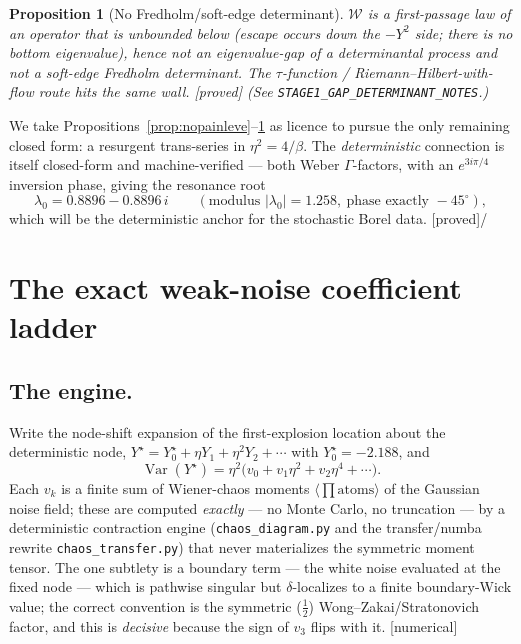 \documentclass[11pt,reqno]{amsart}
\theoremstyle{plain}
\newtheorem{proposition}[theorem]{Proposition}
\theoremstyle{definition}
\theoremstyle{remark}
\newcommand{\W}{\mathcal{W}}
\newcommand{\lz}{\lambda_0}
\DeclareMathOperator{\Var}{Var}
\newcommand{\tagP}{{\footnotesize\textsf{[proved]}}}
\newcommand{\tagN}{{\footnotesize\textsf{[numerical]}}}
\begin{document}
\begin{proposition}[No Fredholm/soft-edge determinant]\label{prop:nofredholm}
$\W$ is a first-passage law of an operator that is \emph{unbounded below} (escape occurs down
the $-Y^2$ side; there is no bottom eigenvalue), hence not an eigenvalue-gap of a determinantal
process and not a soft-edge Fredholm determinant. The $\tau$-function / Riemann--Hilbert-with-flow
route hits the same wall. \tagP{} \emph{(See \texttt{STAGE1\_GAP\_DETERMINANT\_NOTES}.)}
\end{proposition}

We take Propositions~\ref{prop:nopainleve}--\ref{prop:nofredholm} as licence to pursue the only
remaining closed form: a resurgent trans-series in $\eta^2=4/\beta$. The \emph{deterministic}
connection is itself closed-form and machine-verified --- both Weber $\Gamma$-factors, with an
$e^{3i\pi/4}$ inversion phase, giving the resonance root
\begin{equation}\label{eq:lz}
\lz=0.8896-0.8896\,i \qquad(\text{modulus }|\lz|=1.258,\ \text{phase exactly }-45^\circ),
\end{equation}
which will be the deterministic anchor for the stochastic Borel data. \tagP\;/\;\tagN

\section{The exact weak-noise coefficient ladder}\label{sec:ladder}

\subsection{The engine.}
Write the node-shift expansion of the first-explosion location about the deterministic node,
$Y^\star=Y^\star_0+\eta Y_1+\eta^2 Y_2+\cdots$ with $Y^\star_0=-2.188$, and
\begin{equation}\label{eq:series}
\Var(Y^\star)=\eta^2\bigl(v_0+v_1\eta^2+v_2\eta^4+\cdots\bigr).
\end{equation}
Each $v_k$ is a finite sum of Wiener-chaos moments $\langle\prod \text{atoms}\rangle$ of the
Gaussian noise field; these are computed \emph{exactly} --- no Monte Carlo, no truncation --- by
a deterministic contraction engine (\texttt{chaos\_diagram.py} and the transfer/numba rewrite
\texttt{chaos\_transfer.py}) that never materializes the symmetric moment tensor. The one
subtlety is a boundary term --- the white noise evaluated at the fixed node --- which is
pathwise singular but $\delta$-localizes to a finite boundary-Wick value; the correct
convention is the symmetric ($\tfrac12$) Wong--Zakai/Stratonovich factor, and this is
\emph{decisive} because the sign of $v_3$ flips with it. \tagN
\end{document}

